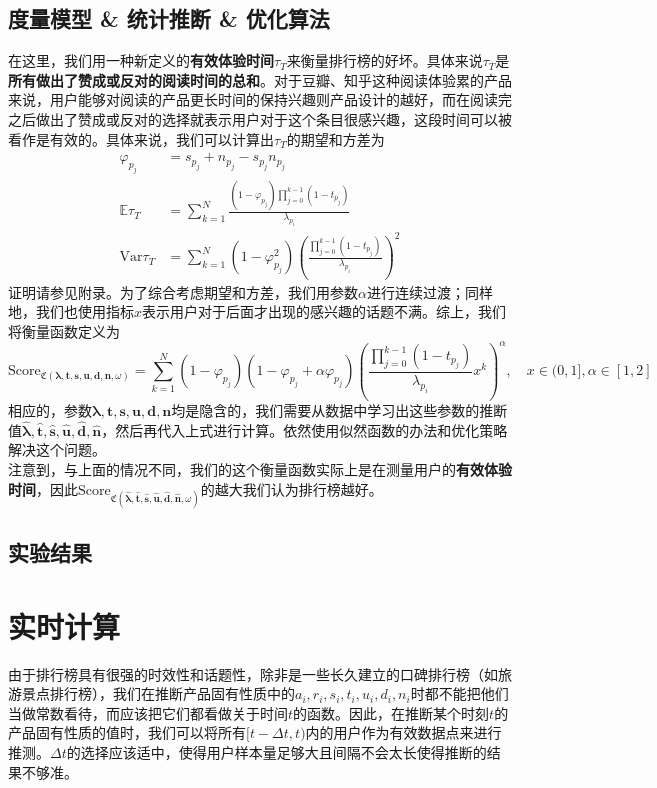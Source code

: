 \documentclass[UTF8]{ctexart}
\theoremstyle{plain}
\theoremstyle{definition}
\theoremstyle{remark}
\begin{document}
	\subsection{度量模型 \& 统计推断 \& 优化算法}
	在这里，我们用一种新定义的\textbf{有效体验时间}$\tau_T$来衡量排行榜的好坏。具体来说$\tau_T$是\textbf{所有做出了赞成或反对的阅读时间的总和}。对于豆瓣、知乎这种阅读体验累的产品来说，用户能够对阅读的产品更长时间的保持兴趣则产品设计的越好，而在阅读完之后做出了赞成或反对的选择就表示用户对于这个条目很感兴趣，这段时间可以被看作是有效的。具体来说，我们可以计算出$\tau_T$的期望和方差为
	\begin{equation} \label{EQ_C}
	\begin{aligned}
	\varphi_{p_j} & = s_{p_j} + n_{p_j} - s_{p_j}n_{p_j} \\
	\mathbb{E} \tau_T & = \sum_{k=1}^N \frac{(1-\varphi_{p_j})\prod\limits_{j=0}^{k-1}(1-t_{p_j})}{\lambda_{p_i}} \\
	\mathrm{Var} \tau_T & = \sum_{k=1}^N (1-\varphi_{p_j}^2)\left(\frac{\prod\limits_{j=0}^{k-1}(1-t_{p_j})}{\lambda_{p_i}}\right)^2
	\end{aligned}
	\end{equation}
	证明请参见附录。为了综合考虑期望和方差，我们用参数$\alpha$进行连续过渡；同样地，我们也使用指标$x$表示用户对于后面才出现的感兴趣的话题不满。综上，我们将衡量函数定义为
	\begin{equation}
	\mathrm{Score}_{\mathfrak{C}\left(\bm{\lambda}, \bm{t}, \bm{s}, \bm{u}, \bm{d}, \bm{n},\omega\right)} = \sum_{k=1}^N (1-\varphi_{p_j})(1-\varphi_{p_j}+\alpha \varphi_{p_j})\left(\frac{\prod\limits_{j=0}^{k-1}(1-t_{p_j})}{\lambda_{p_i}} x^k\right)^\alpha, \quad x \in (0, 1], \alpha \in [1, 2]
	\end{equation}
	相应的，参数$\bm{\lambda}, \bm{t}, \bm{s}, \bm{u}, \bm{d}, \bm{n}$均是隐含的，我们需要从数据中学习出这些参数的推断值$\bm{\hat{\lambda}}, \bm{\hat{t}}, \bm{\hat{s}}, \bm{\hat{u}}, \bm{\hat{d}}, \bm{\hat{n}}$，然后再代入上式进行计算。依然使用似然函数的办法和优化策略解决这个问题。 \\
	
	注意到，与上面的情况不同，我们的这个衡量函数实际上是在测量用户的\textbf{有效体验时间}，因此$\mathrm{Score}_{\mathfrak{C}\left(\bm{\hat{\lambda}}, \bm{\hat{t}}, \bm{\hat{s}}, \bm{\hat{u}}, \bm{\hat{d}}, \bm{\hat{n}},\omega\right)}$的越大我们认为排行榜越好。
	\subsection{实验结果}
	\section{实时计算}
	由于排行榜具有很强的时效性和话题性，除非是一些长久建立的口碑排行榜（如旅游景点排行榜），我们在推断产品固有性质中的$a_i,r_i,s_i,t_i,u_i,d_i,n_i$时都不能把他们当做常数看待，而应该把它们都看做关于时间$t$的函数。因此，在推断某个时刻$t$的产品固有性质的值时，我们可以将所有$[t-\Delta t,t)$内的用户作为有效数据点来进行推测。$\Delta t$的选择应该适中，使得用户样本量足够大且间隔不会太长使得推断的结果不够准。
\end{document}
